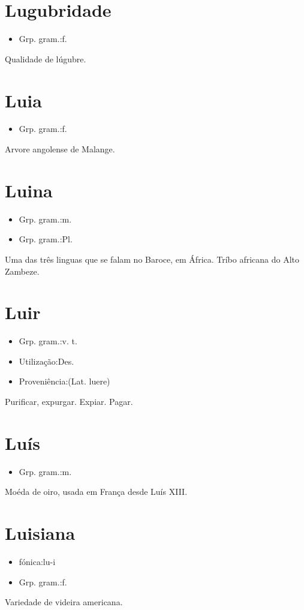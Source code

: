 \section{Lugubridade}
\begin{itemize}
\item {Grp. gram.:f.}
\end{itemize}
Qualidade de lúgubre.
\section{Luia}
\begin{itemize}
\item {Grp. gram.:f.}
\end{itemize}
Arvore angolense de Malange.
\section{Luina}
\begin{itemize}
\item {Grp. gram.:m.}
\end{itemize}
\begin{itemize}
\item {Grp. gram.:Pl.}
\end{itemize}
Uma das três linguas que se falam no Baroce, em África.
Tríbo africana do Alto Zambeze.
\section{Luir}
\begin{itemize}
\item {Grp. gram.:v. t.}
\end{itemize}
\begin{itemize}
\item {Utilização:Des.}
\end{itemize}
\begin{itemize}
\item {Proveniência:(Lat. \textunderscore luere\textunderscore )}
\end{itemize}
Purificar, expurgar.
Expiar.
Pagar.
\section{Luís}
\begin{itemize}
\item {Grp. gram.:m.}
\end{itemize}
Moéda de oiro, usada em França desde Luís XIII.
\section{Luisiana}
\begin{itemize}
\item {fónica:lu-i}
\end{itemize}
\begin{itemize}
\item {Grp. gram.:f.}
\end{itemize}
Variedade de videira americana.
